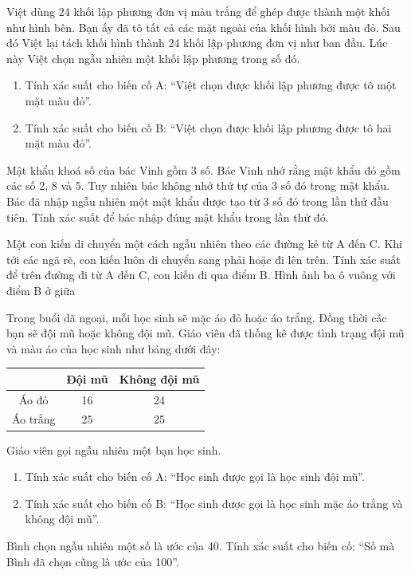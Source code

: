\documentclass[%
    fontsize=12pt,%
    chapterprefix=false,%
    open=right,%
    twoside=false,%
    numbers=noenddot,%
    headings=optiontohead,%
    final,%
    DIV=15,%
    parskip=half %
]{scrbook}
\begin{document}
\begin{tuluan}
\item Việt dùng 24 khối lập phương đơn vị màu trắng để ghép được thành một khối như hình bên. Bạn ấy đã tô tất cả các mặt ngoài của khối hình bởi màu đỏ. Sau đó Việt lại tách khối hình thành 24 khối lập phương đơn vị như ban đầu. Lúc này Việt chọn ngẫu nhiên một khối lập phương trong số đó.
\begin{enumerate}[label=\alph*)]
  \item[a)] Tính xác suất cho biến cố A: ``Việt chọn được khối lập phương được tô một mặt màu đỏ''.
  \item[b)] Tính xác suất cho biến cố B: ``Việt chọn được khối lập phương được tô hai mặt màu đỏ''.
\end{enumerate}

\item Mật khẩu khoá số của bác Vinh gồm 3 số. Bác Vinh nhớ rằng mật khẩu đó gồm các số 2, 8 và 5. Tuy nhiên bác không nhớ thứ tự của 3 số đó trong mật khẩu. Bác đã nhập ngẫu nhiên một mật khẩu được tạo từ 3 số đó trong lần thử đầu tiên. Tính xác suất để bác nhập đúng mật khẩu trong lần thử đó.

\item Một con kiến di chuyển một cách ngẫu nhiên theo các đường kẻ từ A đến C. Khi tới các ngã rẽ, con kiến luôn di chuyển sang phải hoặc đi lên trên. Tính xác suất để trên đường đi từ A đến C, con kiến đi qua điểm B. Hình ảnh ba ô vuông với điểm B ở giữa

\item Trong buổi dã ngoại, mỗi học sinh sẽ mặc áo đỏ hoặc áo trắng. Đồng thời các bạn sẽ đội mũ hoặc không đội mũ. Giáo viên đã thống kê được tình trạng đội mũ và màu áo của học sinh như bảng dưới đây: \begin{tabular}{|c|c|c|} \hline & Đội mũ & Không đội mũ \\ \hline Áo đỏ & 16 & 24 \\ \hline Áo trắng & 25 & 25 \\ \hline \end{tabular} Giáo viên gọi ngẫu nhiên một bạn học sinh.
\begin{enumerate}[label=\alph*)]
  \item[a)] Tính xác suất cho biến cố A: ``Học sinh được gọi là học sinh đội mũ''.
  \item[b)] Tính xác suất cho biến cố B: ``Học sinh được gọi là học sinh mặc áo trắng và không đội mũ''.
\end{enumerate}

\item Bình chọn ngẫu nhiên một số là ước của 40. Tính xác suất cho biến cố: ``Số mà Bình đã chọn cũng là ước của 100''.


\end{tuluan}
\end{document}
